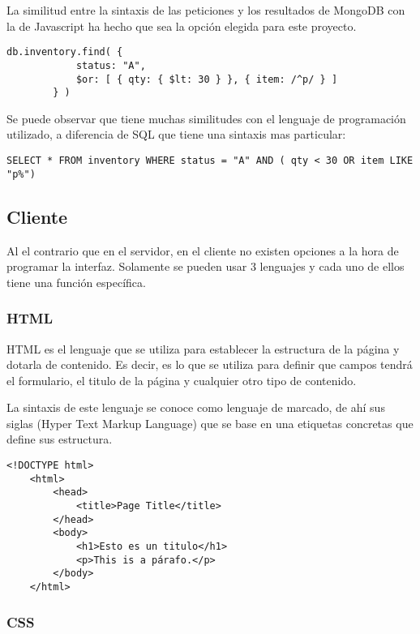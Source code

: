 La similitud entre la sintaxis de las peticiones y los resultados de MongoDB con la de Javascript ha hecho que sea la opción elegida para este proyecto.

\begin{lstlisting}[style=ES6, caption={Ejemplo de una petición en MongoDB}]
		db.inventory.find( {
     		status: "A",
     		$or: [ { qty: { $lt: 30 } }, { item: /^p/ } ]
		} )
\end{lstlisting}

Se puede observar que tiene muchas similitudes con el lenguaje de programación utilizado, a diferencia de SQL que tiene una sintaxis mas particular:

\begin{lstlisting}[style=ES6, caption={Ejemplo de una petición en SQL}]
		SELECT * FROM inventory WHERE status = "A" AND ( qty < 30 OR item LIKE "p%")
\end{lstlisting}

\subsection{Cliente}

Al el contrario que en el servidor, en el cliente no existen opciones a la hora de programar la interfaz. Solamente se pueden usar 3 lenguajes y cada uno de ellos tiene una función específica.

\subsubsection{HTML}

HTML es el lenguaje que se utiliza para establecer la estructura de la página y dotarla de contenido. Es decir, es lo que se utiliza para definir que campos tendrá el formulario, el titulo de la página y cualquier otro tipo de contenido.

La sintaxis de este lenguaje se conoce como lenguaje de marcado, de ahí sus siglas (Hyper Text Markup Language) que se base en una etiquetas concretas que define sus estructura.
\begin{lstlisting}[style=ES6, caption={Ejemplo de una petición en SQL}]
	<!DOCTYPE html>
	<html>
		<head>
			<title>Page Title</title>
		</head>
		<body>
			<h1>Esto es un titulo</h1>
			<p>This is a párafo.</p>
		</body>
	</html> 
\end{lstlisting}

\subsubsection{CSS}

